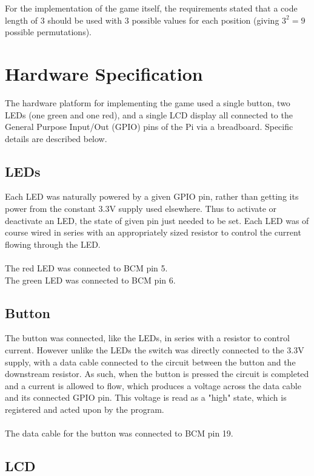 \documentclass[a4paper, titlepage]{article}
\begin{document}
For the implementation of the game itself, the requirements stated that a code length of 3 should be used with 3 possible values for each position (giving $3^2 = 9$ possible permutations). 

\section{Hardware Specification}

The hardware platform for implementing the game used a single button, two LEDs (one green and one red), and a single LCD display all connected to the General Purpose Input/Out (GPIO) pins of the Pi via a breadboard. Specific details are described below.

\subsection{LEDs}

Each LED was naturally powered by a given GPIO pin, rather than getting its power from the constant 3.3V supply used elsewhere. Thus to activate or deactivate an LED, the state of given pin just needed to be set. Each LED was of course wired in series with an appropriately sized resistor to control the current flowing through the LED.
\\
\\
The red LED was connected to BCM pin 5.\\
The green LED was connected to BCM pin 6.

\subsection{Button}

The button was connected, like the LEDs, in series with a resistor to control current. However unlike the LEDs the switch was directly connected to the 3.3V supply, with a data cable connected to the circuit between the button and the downstream resistor. As such, when the button is pressed the circuit is completed and a current is allowed to flow, which produces a voltage across the data cable and its connected GPIO pin. This voltage is read as a "high" state, which is registered and acted upon by the program.
\\
\\
The data cable for the button was connected to BCM pin 19.

\subsection{LCD} 
\end{document}
